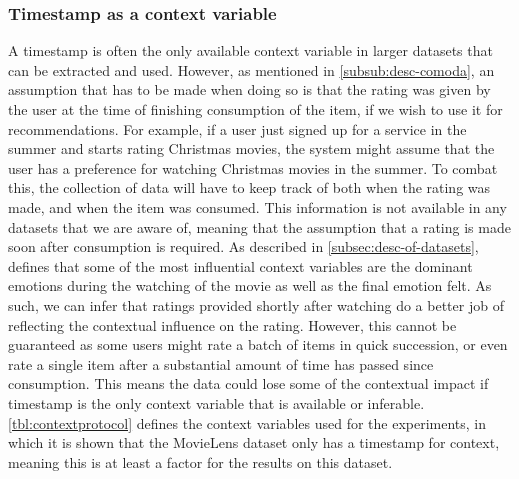 \subsubsection{Timestamp as a context variable}
A timestamp is often the only available context variable in larger datasets that can be extracted and used.
However, as mentioned in \autoref{subsub:desc-comoda}, an assumption that has to be made when doing so is that the rating was given by the user at the time of finishing consumption of the item, if we wish to use it for recommendations.
For example, if a user just signed up for a service in the summer and starts rating Christmas movies, the system might assume that the user has a preference for watching Christmas movies in the summer.
To combat this, the collection of data will have to keep track of both when the rating was made, and when the item was consumed.
This information is not available in any datasets that we are aware of, meaning that the assumption that a rating is made soon after consumption is required.
As described in \autoref{subsec:desc-of-datasets}, \cite{COMODA2013} defines that some of the most influential context variables are the dominant emotions during the watching of the movie as well as the final emotion felt.
As such, we can infer that ratings provided shortly after watching do a better job of reflecting the contextual influence on the rating.
However, this cannot be guaranteed as some users might rate a batch of items in quick succession, or even rate a single item after a substantial amount of time has passed since consumption.
This means the data could lose some of the contextual impact if timestamp is the only context variable that is available or inferable.
\autoref{tbl:contextprotocol} defines the context variables used for the experiments, in which it is shown that the MovieLens dataset only has a timestamp for context, meaning this is at least a factor for the results on this dataset. 

